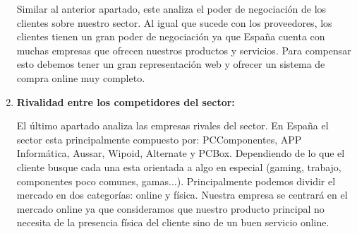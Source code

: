 \begin{enumerate}
    Similar al anterior apartado, este analiza el poder de negociación de los clientes sobre nuestro sector. Al igual que sucede con los proveedores, los clientes tienen un gran poder de negociación ya que España cuenta con muchas empresas que ofrecen nuestros productos y servicios. Para compensar esto debemos tener un gran representación web y ofrecer un sistema de compra online muy completo.

    \item \textbf{Rivalidad entre los competidores del sector:}
    
    El último apartado analiza las empresas rivales del sector. En España el sector esta principalmente compuesto por: PCComponentes, APP Informática, Aussar, Wipoid, Alternate y PCBox. Dependiendo de lo que el cliente busque cada una esta orientada a algo en especial (gaming, trabajo, componentes poco comunes, gamas...). Principalmente podemos dividir el mercado en dos categorías: online y física. Nuestra empresa se centrará en el mercado online ya que consideramos que nuestro producto principal no necesita de la presencia física del cliente sino de un buen servicio online.

\end{enumerate}
